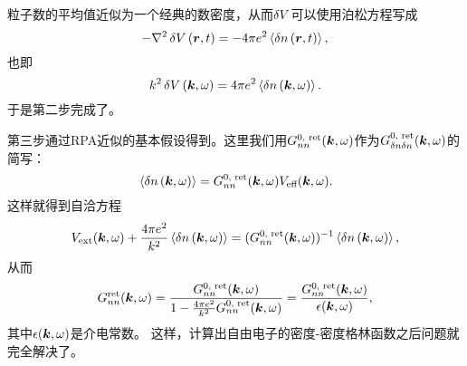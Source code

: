 粒子数的平均值近似为一个经典的数密度，从而$\var{V}$可以使用泊松方程写成
\[
    - \laplacian \var{V}(\vb*{r}, t) = - 4\pi e^2 \expval*{\var{{n}}(\vb*{r}, t)},
\]
也即
\begin{equation}
    k^2 \var{V}(\vb*{k}, \omega) = 4\pi e^2 \expval*{\var{{n}}(\vb*{k}, \omega)}.
\end{equation}
于是第二步完成了。

第三步通过RPA近似的基本假设得到。这里我们用$G^\text{0, ret}_{nn} (\vb*{k}, \omega)$作为$G^\text{0, ret}_{\var{n}\var{n}} (\vb*{k}, \omega)$的简写：
\begin{equation}
    \expval*{\var{{n}}(\vb*{k}, \omega)} = G^\text{0, ret}_{nn} (\vb*{k}, \omega) V_\text{eff} (\vb*{k}, \omega).
    \label{eq:rpa-approximation}
\end{equation}
这样就得到自洽方程
\[
    V_\text{ext}(\vb*{k}, \omega) + \frac{4\pi e^2}{k^2} \expval*{\var{{n}}(\vb*{k}, \omega)} = (G^\text{0, ret}_{nn} (\vb*{k}, \omega))^{-1} \expval*{\var{{n}}(\vb*{k}, \omega)},
\]
从而
\begin{equation}
    G^\text{ret}_{nn}(\vb*{k}, \omega) = \frac{G^\text{0, ret}_{nn}(\vb*{k}, \omega)}{1 - \frac{4\pi e^2}{k^2} G^\text{0, ret}_{nn}(\vb*{k}, \omega)} = \frac{G^\text{0, ret}_{nn}(\vb*{k}, \omega)}{\epsilon(\vb*{k}, \omega)},
    \label{eq:ext-electron-ret-nn}
\end{equation}
其中$\epsilon(\vb*{k}, \omega)$是介电常数。
这样，计算出自由电子的密度-密度格林函数之后问题就完全解决了。

